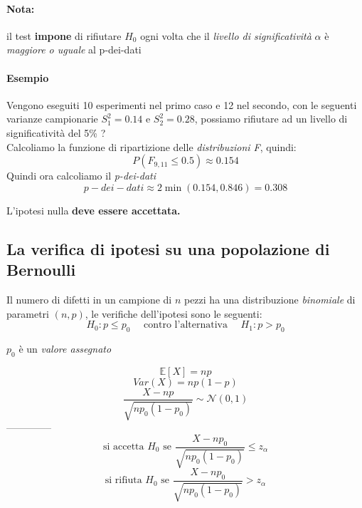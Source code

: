\documentclass[]{article}
\newcommand{\ev}{\mathbb{E}[X]}
\renewcommand{\ev}[1]{\mathbb{E}\left[#1\right]}
\begin{document}
    \paragraph{Nota:} il test \textbf{impone} di rifiutare $H_0$ ogni volta che il \textit{livello di significatività} $\alpha$ è \textit{maggiore o uguale} al p-dei-dati
    \paragraph{Esempio} Vengono eseguiti 10 esperimenti nel primo caso e 12 nel secondo, con le seguenti varianze campionarie $S^2_1 = 0.14$ e $S^2_2 = 0.28$, possiamo rifiutare ad un livello di significatività del 5\% ? \\
    Calcoliamo la funzione di ripartizione delle \textit{distribuzioni F}, quindi:
    \[ P(F_{9,11} \leq 0.5) \approx 0.154 \]
    Quindi ora calcoliamo il \textit{p-dei-dati}
    \[ p-dei-dati \approx 2 \min(0.154, 0.846) = 0.308 \]
    \centerline{L'ipotesi nulla \textbf{deve essere accettata. }}
    \subsection{La verifica di ipotesi su una popolazione di Bernoulli}
    Il numero di difetti in un campione di $n$ pezzi ha una distribuzione \textit{binomiale} di parametri $(n, p)$, le verifiche dell'ipotesi sono le seguenti:
    \[ H_0 : p \leq p_0 \quad \text{ contro l'alternativa } \quad H_1 : p > p_0 \]
    \centerline{$p_0$ è un \textit{valore assegnato}}
    \[ \ev{X} = np \]
    \[ Var(X) = np (1-p) \]
    \[ \frac{X - np}{\sqrt{np_0 (1- p_0)}} \sim \mathcal{N}(0,1) \]
    --------------
    \[ \text{si accetta } H_0 \text{ se } \frac{X - np_0}{\sqrt{np_0 (1- p_0)}} \leq z_\alpha \]
    \[ \text{si rifiuta } H_0 \text{ se } \frac{X - np_0}{\sqrt{np_0 (1- p_0)}} > z_\alpha \]
\end{document}
